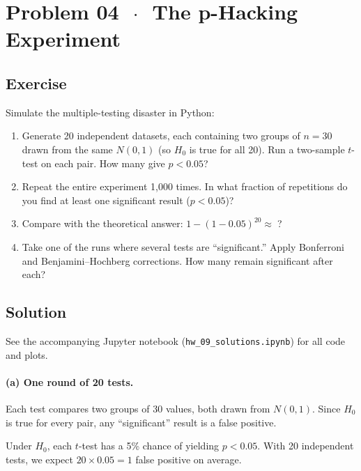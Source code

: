 \documentclass[11pt]{article}
\begin{document}
\section*{Problem 04 \texorpdfstring{$\,\cdot\,$}{-} The p-Hacking Experiment}

\subsection*{Exercise}

Simulate the multiple-testing disaster in Python:

\begin{enumerate}[label=\alph*)]
  \item Generate 20 independent datasets, each containing two groups of $n = 30$ drawn from the same $N(0, 1)$ (so $H_0$ is true for all 20). Run a two-sample $t$-test on each pair. How many give $p < 0.05$?
  \item Repeat the entire experiment 1,000 times. In what fraction of repetitions do you find at least one significant result ($p < 0.05$)?
  \item Compare with the theoretical answer: $1 - (1 - 0.05)^{20} \approx\;$?
  \item Take one of the runs where several tests are ``significant.'' Apply Bonferroni and Benjamini--Hochberg corrections. How many remain significant after each?
\end{enumerate}

\subsection*{Solution}

See the accompanying Jupyter notebook (\texttt{hw\_09\_solutions.ipynb}) for all code and plots.

\paragraph{(a) One round of 20 tests.}

Each test compares two groups of 30 values, both drawn from $N(0,1)$. Since $H_0$ is true for every pair, any ``significant'' result is a false positive.

Under $H_0$, each $t$-test has a 5\% chance of yielding $p < 0.05$. With 20 independent tests, we expect $20 \times 0.05 = 1$ false positive on average.
\end{document}
